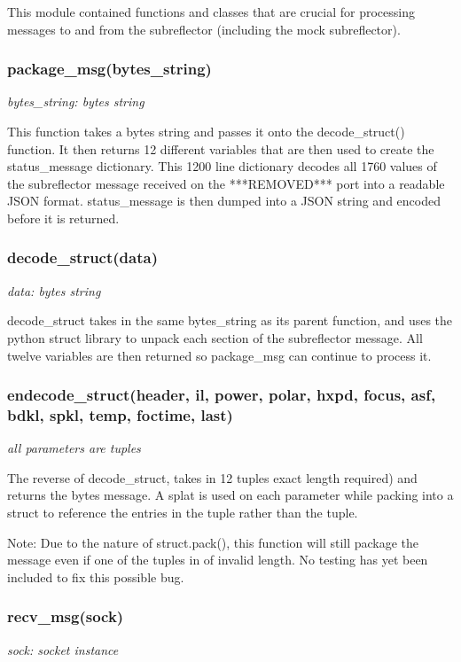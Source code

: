 \documentclass{article}
\begin{document}
This module contained functions and classes that are crucial for processing messages to and from the subreflector (including the mock subreflector).
 
\subsubsection*{package\_msg(bytes\_string)}
\emph{bytes\_string: bytes string}
\vspace{10pt}

This function takes a bytes string and passes it onto the decode\_struct() function. It then returns 12 different variables that are then used to create the status\_message dictionary. This 1200 line dictionary decodes all 1760  values of the subreflector message received on the ***REMOVED*** port into a readable JSON format. status\_message is then dumped into a JSON string and encoded before it is returned.

\subsubsection*{decode\_struct(data)}
\emph{data: bytes string}
\vspace{10pt}

decode\_struct takes in the same bytes\_string as its parent function, and uses the python struct library to unpack each section of the subreflector message. All twelve variables are then returned so package\_msg can continue to process it.

\subsubsection*{endecode\_struct(header, il, power, polar, hxpd, focus, asf, bdkl, spkl, temp, foctime, last)}
\emph{all parameters are tuples}
\vspace{10pt}

The reverse of decode\_struct, takes in 12 tuples exact length required) and returns the bytes message. A splat is used on each parameter while packing into a struct to reference the entries in the tuple rather than the tuple. 
\vspace{5pt}

Note: Due to the nature of struct.pack(), this function will still package the message even if one of the tuples in of invalid length. No testing has yet been included to fix this possible bug. 

\subsubsection*{recv\_msg(sock)}
\emph{sock: socket instance}
\vspace{10pt}
\end{document}
